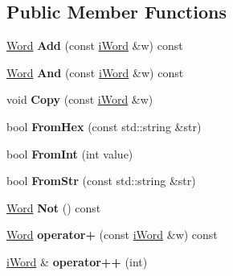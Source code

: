 \subsection*{Public Member Functions}
\begin{DoxyCompactItemize}
\item 
\hypertarget{classWord_ae9478910c6cb8c30abeedf7fc6ba5b36}{
\hyperlink{classWord}{Word} {\bfseries Add} (const \hyperlink{classiWord}{iWord} \&w) const }
\label{classWord_ae9478910c6cb8c30abeedf7fc6ba5b36}

\item 
\hypertarget{classWord_a08eca1ca0af51daee452ba719f9407c5}{
\hyperlink{classWord}{Word} {\bfseries And} (const \hyperlink{classiWord}{iWord} \&w) const }
\label{classWord_a08eca1ca0af51daee452ba719f9407c5}

\item 
\hypertarget{classWord_a8c094d866fe9af5da5d32c98430a86f8}{
void {\bfseries Copy} (const \hyperlink{classiWord}{iWord} \&w)}
\label{classWord_a8c094d866fe9af5da5d32c98430a86f8}

\item 
\hypertarget{classWord_a247de32d413b48d2934f41caaa6cce77}{
bool {\bfseries FromHex} (const std::string \&str)}
\label{classWord_a247de32d413b48d2934f41caaa6cce77}

\item 
\hypertarget{classWord_aed80a61d7e2da2dbcde483058acd4259}{
bool {\bfseries FromInt} (int value)}
\label{classWord_aed80a61d7e2da2dbcde483058acd4259}

\item 
\hypertarget{classWord_a0b255da1e924b2ab520cc5ca271bacf0}{
bool {\bfseries FromStr} (const std::string \&str)}
\label{classWord_a0b255da1e924b2ab520cc5ca271bacf0}

\item 
\hypertarget{classWord_afdecfa9e3f2fda36496f249617a4cef5}{
\hyperlink{classWord}{Word} {\bfseries Not} () const }
\label{classWord_afdecfa9e3f2fda36496f249617a4cef5}

\item 
\hypertarget{classWord_a0fa830d2d54ba68107d035c316b8d3ab}{
\hyperlink{classWord}{Word} {\bfseries operator+} (const \hyperlink{classiWord}{iWord} \&w) const }
\label{classWord_a0fa830d2d54ba68107d035c316b8d3ab}

\item 
\hypertarget{classWord_ae921b75d263be790fd150c5962445163}{
\hyperlink{classiWord}{iWord} \& {\bfseries operator++} (int)}
\label{classWord_ae921b75d263be790fd150c5962445163}


\end{DoxyCompactItemize}
